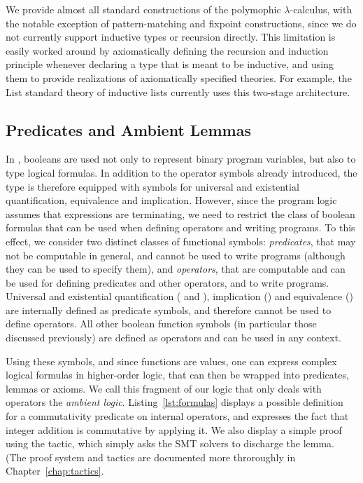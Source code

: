 We provide almost all standard constructions of the polymophic
$\lambda$-calculus, with the notable exception of pattern-matching and fixpoint
constructions, since we do not currently support inductive types or recursion
directly. This limitation is easily worked around by axiomatically defining the
recursion and induction principle whenever declaring a type that is meant to be
inductive, and using them to provide realizations of axiomatically specified
theories. For example, the \textsf{List} standard theory of inductive lists
currently uses this two-stage architecture.


\subsection{Predicates and Ambient Lemmas\label{sec:ec-specifics}}
In \EasyCrypt, booleans are used not only to represent binary program variables, but
also to type logical formulas. In addition to the operator symbols already
introduced, the  type is therefore equipped with
symbols for universal and existential quantification, equivalence and
implication. However, since the program logic assumes that expressions are
terminating, we need to restrict the class of boolean formulas that can be used
when defining operators and writing programs. To this effect, we consider two
distinct classes of functional symbols: \emph{predicates}, that may not be
computable in general, and cannot be used to write programs (although they can
be used to specify them), and \emph{operators}, that are computable and can be
used for defining predicates and other operators, and to write programs.
Universal and existential quantification ( and ),
implication (\rawec{=>}) and equivalence (\rawec{<=>}) are internally defined as
predicate symbols, and therefore cannot be used to define operators. All other
boolean function symbols (in particular those discussed previously) are defined
as operators and can be used in any context.

Using these symbols, and since functions are values, one can express complex
logical formulas in higher-order logic, that can then be wrapped into
predicates, lemmas or axioms. We call this fragment of our logic that only
deals with operators the \emph{ambient logic}. Listing~\ref{lst:formulas}
displays a possible definition for a commutativity predicate on internal
operators, and expresses the fact that integer addition is commutative by
applying it. We also display a simple proof using the  tactic, which
simply asks the SMT solvers to discharge the lemma. (The proof system and
tactics are documented more throroughly in Chapter~\ref{chap:tactics}.

